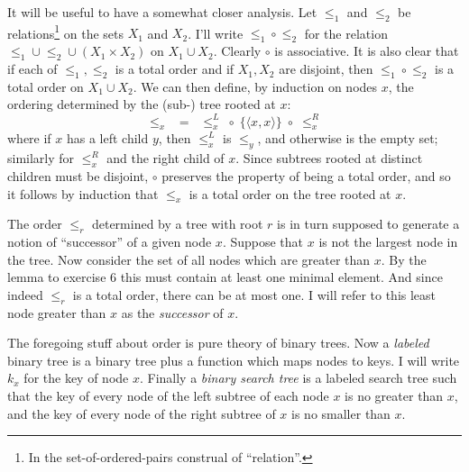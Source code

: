 \documentclass[
]{article}
\begin{document}
It will be useful to have a somewhat closer analysis. Let $\leq_1$ and $\leq_2$ be relations\footnote{In the set-of-ordered-pairs construal of ``relation''.} on the sets $X_1$ and $X_2$.  I'll write ${\leq_1}\circ{\leq_2}$ for the relation ${\leq_1}\cup {\leq_2}\cup (X_1\times X_2)$ on $X_1\cup X_2$.  Clearly $\circ$ is associative.  It is also clear that if each of ${\leq_1},{\leq_2}$  is a total order and if $X_1,X_2$ are disjoint, then ${\leq_1}\circ{\leq_2}$ is a total order on $X_1\cup X_2$.
We can then define, by induction on nodes $x$, the ordering determined by the (sub-) tree rooted at $x$:
\begin{equation}
  \label{defOrd}
  {\leq_x} \;\;=\;\; {\leq^{L}_x}\;\circ\; \{\langle x,x\rangle\}\;\circ\;{\leq^{R}_x}
\end{equation}
where if $x$ has a left child $y$, then $\leq^L_x$ is $\leq_{y}$, and otherwise is the empty set; similarly for $\leq^R_x$ and the right child of $x$.  Since subtrees rooted at distinct children must be disjoint, $\circ$ preserves the property of being a total order, and so it follows by induction that $\leq_x$ is a total order on the tree rooted at $x$.

The order $\leq_r$ determined by a tree with root $r$ is in turn supposed to generate a notion of ``successor'' of a given node $x$.  Suppose that $x$ is not the largest node in the tree.  Now consider the set of all nodes which are greater than $x$.  By the lemma to exercise 6 this must contain at least one minimal element.  And since indeed $\leq_r$ is a total order, there can be at most one.  I will refer to this least node greater than $x$ as the \emph{successor} of $x$.




The foregoing stuff about order is pure theory of binary trees.  Now a \emph{labeled} binary tree is a binary tree plus a function which maps nodes to keys.  I will write $k_x$ for the key of node $x$.  Finally a \emph{binary search tree} is a labeled search tree such that the key of every node of the left subtree of each node $x$ is no greater than $x$, and the key of every node of the right subtree of $x$ is no smaller than $x$.
\end{document}
